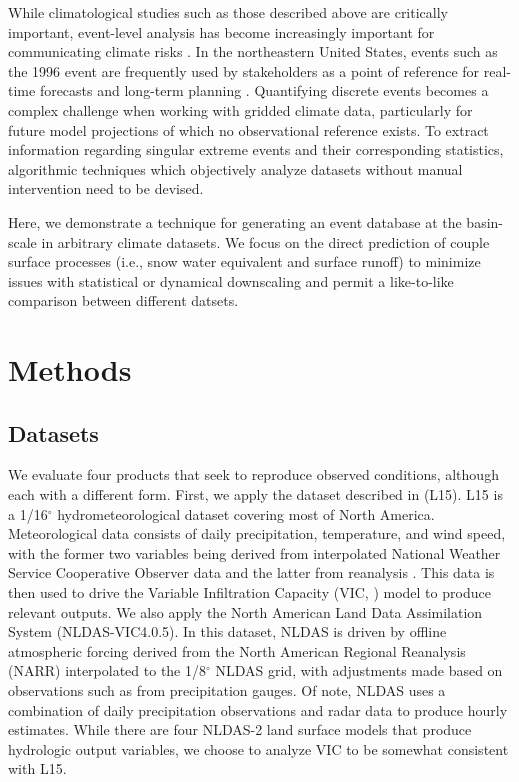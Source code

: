 \documentclass[draft]{agujournal2019}
\newcommand{\degree}{$^{\circ}$}
\begin{document}
While climatological studies such as those described above are critically important, event-level analysis has become increasingly important for communicating climate risks \citep{shepherd2018storylines}. In the northeastern United States, events such as the 1996 event are frequently used by stakeholders as a point of reference for real-time forecasts and long-term planning \citep{george2019the}. Quantifying discrete events becomes a complex challenge when working with gridded climate data, particularly for future model projections of which no observational reference exists. To extract information regarding singular extreme events and their corresponding statistics, algorithmic techniques which objectively analyze datasets without manual intervention need to be devised.

Here, we demonstrate a technique for generating an event database at the basin-scale in arbitrary climate datasets. We focus on the direct prediction of couple surface processes (i.e., snow water equivalent and surface runoff) to minimize issues with statistical or dynamical downscaling and permit a like-to-like comparison between different datsets.

\section{Methods}

\subsection{Datasets}

We evaluate four products that seek to reproduce observed conditions, although each with a different form. First, we apply the dataset described in \citet{livneh2015spatially} (L15). L15 is a 1/16\degree{} hydrometeorological dataset covering most of North America. Meteorological data consists of daily precipitation, temperature, and wind speed, with the former two variables being derived from interpolated National Weather Service Cooperative Observer data and the latter from reanalysis \citep{henn2018an}. This data is then used to drive the Variable Infiltration Capacity (VIC, \citet{liang1994simple}) model to produce relevant outputs. We also apply the North American Land Data Assimilation System (NLDAS-VIC4.0.5). In this dataset, NLDAS is driven by offline atmospheric forcing derived from the North American Regional Reanalysis (NARR) interpolated to the 1/8\degree{} NLDAS grid, with adjustments made based on observations such as from precipitation gauges. Of note, NLDAS uses a combination of daily precipitation observations and radar data to produce hourly estimates. While there are four NLDAS-2 land surface models that produce hydrologic output variables, we choose to analyze VIC to be somewhat consistent with L15.
\end{document}
